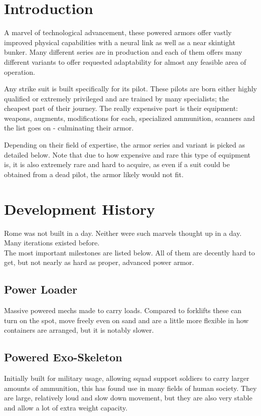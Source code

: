 \documentclass[12pt,a4paper,openany]{book}
\begin{document}
	

	\chapter{Introduction}
	A marvel of technological advancement, these powered armors offer vastly improved physical capabilities with a neural link as well as a near skintight bunker. Many different series are in production and each of them offers many different variants to offer requested adaptability for almost any feasible area of operation.\par
	Any strike suit is built specifically for its pilot. These pilots are born either highly qualified or extremely privileged and are trained by many specialists; the cheapest part of their journey. The really expensive part is their equipment: weapons, augments, modifications for each, specialized ammunition, scanners and the list goes on - culminating their armor.\par
	Depending on their field of expertise, the armor series and variant is picked as detailed below. Note that due to how expensive and rare this type of equipment is, it is also extremely rare and hard to acquire, as even if a suit could be obtained from a dead pilot, the armor likely would not fit.
	
	\chapter{Development History}
	Rome was not built in a day. Neither were such marvels thought up in a day. Many iterations existed before.
	\\%
	The most important milestones are listed below. All of them are decently hard to get, but not nearly as hard as proper, advanced power armor.
	\section{Power Loader}
	Massive powered mechs made to carry loads. Compared to forklifts these can turn on the spot, move freely even on sand and are a little more flexible in how containers are arranged, but it is notably slower.
	\par
	\section{Powered Exo-Skeleton}
	Initially built for military usage, allowing squad support soldiers to carry larger amounts of ammunition, this has found use in many fields of human society. They are large, relatively loud and slow down movement, but they are also very stable and allow a lot of extra weight capacity.
	\par
\end{document}
